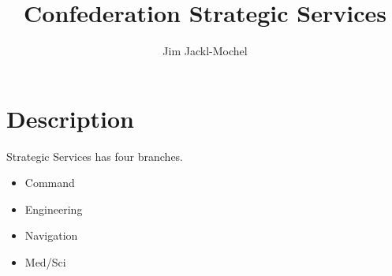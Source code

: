 \documentclass[11pt,titlepage]{article}
\begin{document}
\title{Confederation Strategic Services}
\author{Jim Jackl-Mochel}
\maketitle

\section{Description}
Strategic Services has four branches.

\begin{itemize}
	\item Command
	\item Engineering
	\item Navigation
	\item Med/Sci
\end{itemize}
\end{document}
